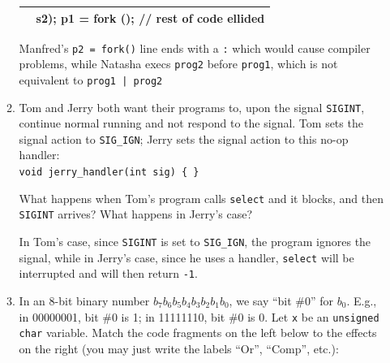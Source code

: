 \documentclass[11pt]{article}
\begin{document}
\begin{enumerate}
\begin{enumerate}
\begin{tabular}{| c | c |}
{\begin{minipage}{3in}
\begin{Verbatim}
// pipe creation ellided
pid_t p1, p2;
int s1, s2;
p2 = fork ();
if (p2 == 0) {
	// close and dup2 ellided
	execlp("prog2", "prog2",
	(char*)NULL);
} else if (p2 > 0) {
	// close ellided waitpid(p2, &s2);
	p1 = fork ();
	// rest of code ellided

			\end{Verbatim}
			\end{minipage}}\\
		\hline
			\end{tabular}
		\begin{tcolorbox}Manfred's \Verb|p2 = fork()| line ends with a \Verb|:| which would cause compiler problems, while Natasha execs \Verb|prog2| before \Verb|prog1|, which is not equivalent to \Verb'prog1 | prog2'\end{tcolorbox}

		\item Tom and Jerry both want their programs to, upon the signal \Verb|SIGINT|, continue normal running and not respond to the signal. Tom sets the signal action to \Verb|SIG_IGN|; Jerry sets the signal action to this no-op handler:\\
		\Verb|void jerry_handler(int sig) { }|

		What happens when Tom’s program calls \Verb|select| and it blocks, and then \Verb|SIGINT| arrives? What happens in Jerry’s case?
		\begin{tcolorbox}In Tom's case, since \Verb|SIGINT| is set to \Verb|SIG_IGN|, the program ignores the signal, while in Jerry's case, since he uses a handler, \Verb|select| will be interrupted and will then return \Verb|-1|.\end{tcolorbox}

		\newpage
		\item In an 8-bit binary number $ b_7b_6b_5b_4b_3b_2b_1b_0 $, we say “bit \#0” for $ b_0 $. E.g., in 00000001, bit \#0 is 1; in 11111110, bit \#0 is 0. Let \Verb|x| be an \Verb|unsigned char| variable. Match the code fragments on the left below to the effects on the right (you may just write the labels “Or”, “Comp”, etc.):\\


\end{enumerate}
\end{enumerate}
\end{document}
